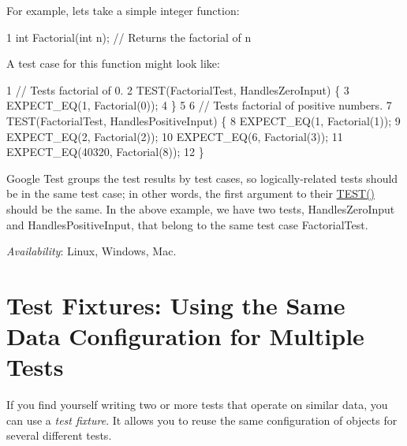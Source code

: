 For example, let\textquotesingle{}s take a simple integer function\+: 
\begin{DoxyCode}
1 int Factorial(int n); // Returns the factorial of n
\end{DoxyCode}


A test case for this function might look like\+: 
\begin{DoxyCode}
1 // Tests factorial of 0.
2 TEST(FactorialTest, HandlesZeroInput) \{
3   EXPECT\_EQ(1, Factorial(0));
4 \}
5 
6 // Tests factorial of positive numbers.
7 TEST(FactorialTest, HandlesPositiveInput) \{
8   EXPECT\_EQ(1, Factorial(1));
9   EXPECT\_EQ(2, Factorial(2));
10   EXPECT\_EQ(6, Factorial(3));
11   EXPECT\_EQ(40320, Factorial(8));
12 \}
\end{DoxyCode}


Google Test groups the test results by test cases, so logically-\/related tests should be in the same test case; in other words, the first argument to their {\ttfamily \hyperlink{gtest_8h_ad8b332753515c0ab8baada563c2547eb}{T\+E\+S\+T()}} should be the same. In the above example, we have two tests, {\ttfamily Handles\+Zero\+Input} and {\ttfamily Handles\+Positive\+Input}, that belong to the same test case {\ttfamily Factorial\+Test}.

{\itshape Availability}\+: Linux, Windows, Mac.

\section*{Test Fixtures\+: Using the Same Data Configuration for Multiple Tests}

If you find yourself writing two or more tests that operate on similar data, you can use a {\itshape test fixture}. It allows you to reuse the same configuration of objects for several different tests.

